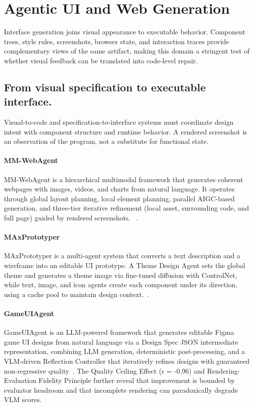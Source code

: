 \section{Agentic UI and Web Generation}
\label{sec:ui-web}

Interface generation joins visual appearance to executable behavior. Component trees, style rules, screenshots, browser state, and interaction traces provide complementary views of the same artifact, making this domain a stringent test of whether visual feedback can be translated into code-level repair.

\subsection{From visual specification to executable interface.}
Visual-to-code and specification-to-interface systems must coordinate design intent with component structure and runtime behavior. A rendered screenshot is an observation of the program, not a substitute for functional state.

\paragraph{MM-WebAgent}
MM-WebAgent is a hierarchical multimodal framework that generates coherent webpages with images, videos, and charts from natural language. It operates through global layout planning, local element planning, parallel AIGC-based generation, and three-tier iterative refinement (local asset, surrounding code, and full page) guided by rendered screenshots. ~\cite{avg260415309}.

\paragraph{MAxPrototyper}
MAxPrototyper is a multi-agent system that converts a text description and a wireframe into an editable UI prototype. A Theme Design Agent sets the global theme and generates a theme image via fine-tuned diffusion with ControlNet, while text, image, and icon agents create each component under its direction, using a cache pool to maintain design context.~\cite{yuan2024maxprototyper}.

\paragraph{GameUIAgent}
GameUIAgent is an LLM-powered framework that generates editable Figma game UI designs from natural language via a Design Spec JSON intermediate representation, combining LLM generation, deterministic post-processing, and a VLM-driven Reflection Controller that iteratively refines designs with guaranteed non-regressive quality~\cite{avg260314724}. The Quality Ceiling Effect (r = -0.96) and Rendering-Evaluation Fidelity Principle further reveal that improvement is bounded by evaluator headroom and that incomplete rendering can paradoxically degrade VLM scores.

